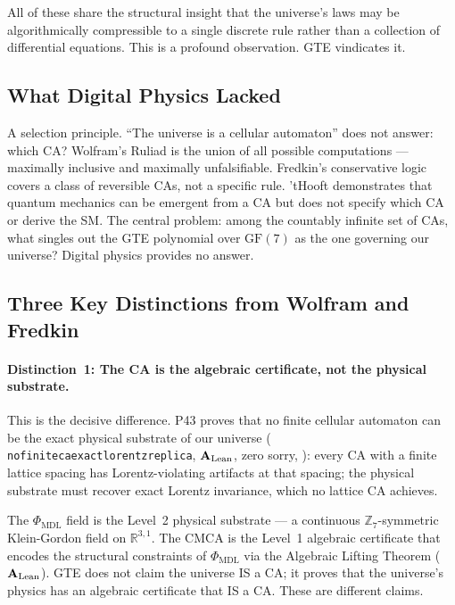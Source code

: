\documentclass[11pt,openany]{book}
\theoremstyle{remark}
\newcommand{\PHIMDL}{\Phi_{\mathrm{MDL}}}
\newcommand{\ZS}{\mathbb{Z}_7}
\newcommand{\lean}[1]{%
  \penalty-100
  \begingroup\def\_{\textunderscore\allowbreak}\texttt{#1}\endgroup}
\newcommand{\CatAL}{\ensuremath{\textbf{A}_{\rm Lean}}}
\begin{document}
All of these share the structural insight that the universe's laws may be algorithmically
compressible to a single discrete rule rather than a collection of differential equations.
This is a profound observation.  GTE vindicates it.

\subsection*{What Digital Physics Lacked}

A selection principle.  ``The universe is a cellular automaton'' does not answer: which
CA?  Wolfram's Ruliad is the union of all possible computations — maximally inclusive and
maximally unfalsifiable.  Fredkin's conservative logic covers a class of reversible CAs,
not a specific rule.  'tHooft demonstrates that quantum mechanics can be emergent from
a CA but does not specify which CA or derive the SM.  The central problem: among the
countably infinite set of CAs, what singles out the GTE polynomial over $\mathrm{GF}(7)$
as the one governing our universe?  Digital physics provides no answer.

\subsection*{Three Key Distinctions from Wolfram and Fredkin}

\paragraph{Distinction~1: The CA is the algebraic certificate, not the physical substrate.}

This is the decisive difference.  P43 proves that no finite cellular automaton can be the
exact physical substrate of our universe
(\lean{no\_finite\_ca\_exact\_lorentz\_replica}, \CatAL, zero sorry,
\cite{SpivackCompleteness}): every CA with a finite lattice spacing has Lorentz-violating
artifacts at that spacing; the physical substrate must recover exact Lorentz invariance,
which no lattice CA achieves.

The $\PHIMDL$ field is the Level~2 physical substrate — a continuous $\ZS$-symmetric
Klein-Gordon field on $\mathbb{R}^{3,1}$.  The CMCA is the Level~1 algebraic certificate
that encodes the structural constraints of $\PHIMDL$ via the Algebraic Lifting Theorem
(\CatAL).  GTE does not claim the universe IS a CA; it proves that the universe's physics
has an algebraic certificate that IS a CA.  These are different claims.
\end{document}
